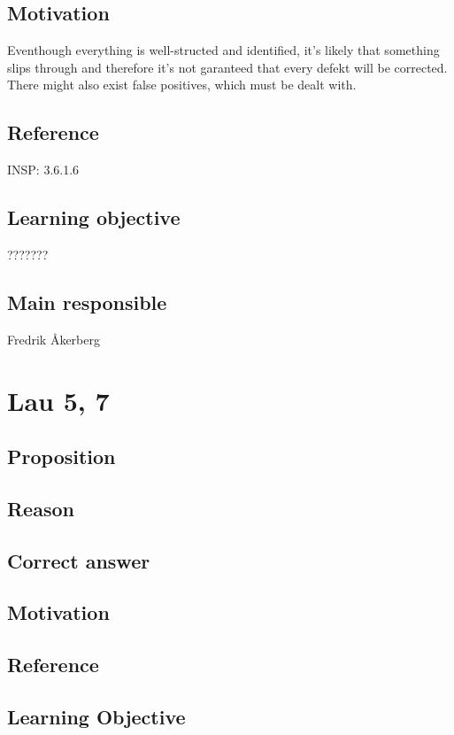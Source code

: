 \documentclass[a4paper]{article}
\begin{document}
\subsection*{Motivation}
Eventhough everything is well-structed and identified, it's likely that something slips through and therefore it's not garanteed that every defekt will be corrected.
There might also exist false positives, which must be dealt with.
\subsection*{Reference}
INSP: 3.6.1.6
\subsection*{Learning objective}
???????
\subsection*{Main responsible}
Fredrik Åkerberg

\section{Lau 5, 7}
	\subsection{Proposition}

	\subsection{Reason}

	\subsection{Correct answer}

	\subsection{Motivation}

	\subsection{Reference}

	\subsection{Learning Objective}
\end{document}
